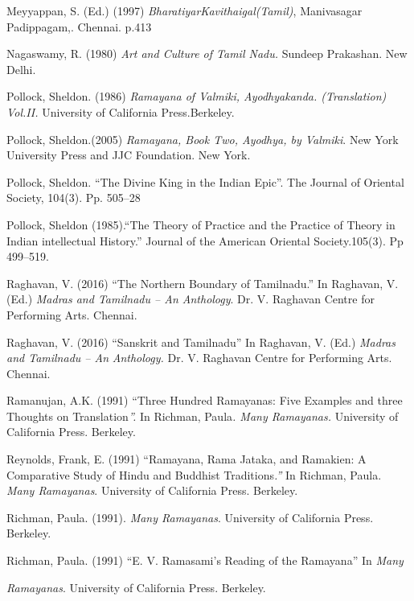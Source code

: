\begin{thebibliography}{99}
  Meyyappan, S. (Ed.) (1997) \textit{BharatiyarKavithaigal(Tamil)}, Manivasagar Padippagam,. Chennai. p.413

  Nagaswamy, R. (1980) \textit{Art and Culture of Tamil Nadu.} Sundeep Prakashan. New Delhi.

  Pollock, Sheldon. (1986) \textit{Ramayana of Valmiki, Ayodhyakanda. (Translation) Vol.II.} University of California Press.Berkeley.

  Pollock, Sheldon.(2005) \textit{Ramayana, Book Two, Ayodhya, by Valmiki}. New York University Press and JJC Foundation. New York.

  Pollock, Sheldon. “The Divine King in the Indian Epic”. The Journal of Oriental Society, 104(3). Pp. 505–28

  Pollock, Sheldon (1985).“The Theory of Practice and the Practice of Theory in Indian intellectual History.” Journal of the American Oriental Society.105(3). Pp 499–519.

  Raghavan, V. (2016) “The Northern Boundary of Tamilnadu.” In Raghavan, V. (Ed.) \textit{Madras and Tamilnadu – An Anthology}. Dr. V. Raghavan Centre for Performing Arts. Chennai.

  Raghavan, V. (2016) “Sanskrit and Tamilnadu” In Raghavan, V. (Ed.) \textit{Madras and Tamilnadu – An} \textit{Anthology.} Dr. V. Raghavan Centre for Performing Arts. Chennai.

  Ramanujan, A.K. (1991) “Three Hundred Ramayanas: Five Examples and three Thoughts on Translation\textit{”.} In Richman, Paula\textit{. Many Ramayanas.} University of California Press. Berkeley.

  Reynolds, Frank, E. (1991) “Ramayana, Rama Jataka, and Ramakien: A Comparative Study of Hindu and Buddhist Traditions\textit{.”} In Richman, Paula.\textit{ Many Ramayanas}. University of California Press. Berkeley.

  Richman, Paula. (1991). \textit{Many Ramayanas}. University of California Press. Berkeley.

  Richman, Paula. (1991) “E. V. Ramasami's Reading of the Ramayana” In \textit{Many}

  \textit{Ramayanas}. University of California Press. Berkeley.


\end{thebibliography}
